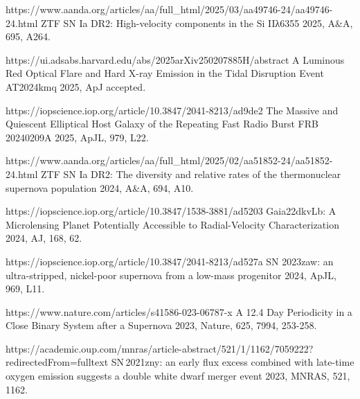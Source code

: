 \begin{cvpubs}
{\begin{cvitems}
    \item {}
    {\Cliu}
    {https://www.aanda.org/articles/aa/full_html/2025/03/aa49746-24/aa49746-24.html}
    {ZTF SN Ia DR2: High-velocity components in the Si IIλ6355}
    {2025, A\&A, 695, A264.}
    \item {}
    {\Cliu}
    {https://ui.adsabs.harvard.edu/abs/2025arXiv250207885H/abstract}
    {A Luminous Red Optical Flare and Hard X-ray Emission in the Tidal Disruption Event AT2024kmq}
    {2025, ApJ accepted.}
    \item {}
    {\Cliu}
    {https://iopscience.iop.org/article/10.3847/2041-8213/ad9de2}
    {The Massive and Quiescent Elliptical Host Galaxy of the Repeating Fast Radio Burst FRB 20240209A}
    {2025, ApJL, 979, L22.}
    \item {}
    {\Cliu}
    {https://www.aanda.org/articles/aa/full_html/2025/02/aa51852-24/aa51852-24.html}
    {ZTF SN Ia DR2: The diversity and relative rates of the thermonuclear supernova population}
    {2024, A\&A, 694, A10.}
    \item {} 
    {\Cliu}
    {https://iopscience.iop.org/article/10.3847/1538-3881/ad5203}
    {Gaia22dkvLb: A Microlensing Planet Potentially Accessible to Radial-Velocity Characterization}
    {2024, AJ, 168, 62.}
    \item {} 
    {\Cliu}
    {https://iopscience.iop.org/article/10.3847/2041-8213/ad527a}
    {SN 2023zaw: an ultra-stripped, nickel-poor supernova from a low-mass progenitor}
    {2024, ApJL, 969, L11.}
    \item {} 
    {\Cliu}
    {https://www.nature.com/articles/s41586-023-06787-x}
    {A 12.4 Day Periodicity in a Close Binary System after a Supernova}
    {2023, Nature, 625, 7994, 253-258.}
    \item {} 
    {\Cliu}
    {https://academic.oup.com/mnras/article-abstract/521/1/1162/7059222?redirectedFrom=fulltext}
    {SN\,2021zny: an early flux excess combined with late-time oxygen emission suggests a double white dwarf merger event}
    {2023, MNRAS, 521, 1162.}
\end{cvitems}
}


\end{cvpubs}


